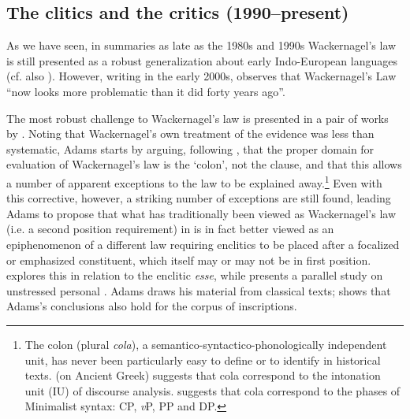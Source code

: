 \documentclass[output=paper]{../langscibook}
\begin{document}

\subsection{The clitics and the critics (1990--present)}
As we have seen, in summaries as late as the 1980s and 1990s Wackernagel's law is still presented as a robust generalization about early Indo-European languages (cf. also \citealp{Collinge1985}). However, writing in the early 2000s, \citet[168]{Clackson2007} observes that Wackernagel's Law ``now looks more problematic than it did forty years ago''.

The most robust challenge to Wackernagel's law is presented in a pair of works by \citet{Adams1994book,Adams1994pronouns}. Noting that Wackernagel's own treatment of the  evidence was less than systematic, Adams starts by arguing, following \citet{Fraenkel1932,Fraenkel1933,Fraenkel1965}, that the proper domain for evaluation of Wackernagel's law is the `colon', not the clause, and that this allows a number of apparent exceptions to the law to be explained away.\footnote{The colon (plural \textit{cola}), a semantico-syntactico-phonologically independent unit, has never been particularly easy to define or to identify in historical texts. \citet{Scheppers2011} (on Ancient Greek) suggests that cola correspond to the intonation unit (IU) of discourse analysis. \citet[259--262]{Ledgeway2012} suggests that cola correspond to the phases of Minimalist syntax: CP, \textit{v}P, PP and DP.} Even with this corrective, however, a striking number of exceptions are still found, leading Adams to propose that what has traditionally been viewed as Wackernagel's law (i.e. a second position requirement) in  is in fact better viewed as an epiphenomenon of a different law requiring enclitics to be placed after a focalized or emphasized constituent, which itself may or may not be in first position. \citet{Adams1994book} explores this in relation to the  enclitic  \textit{esse}, while \citet{Adams1994pronouns} presents a parallel study on unstressed personal . Adams draws his material from classical   texts; \citet{Kruschwitz2004} shows that Adams's conclusions also hold for the corpus of  inscriptions.
\end{document}
